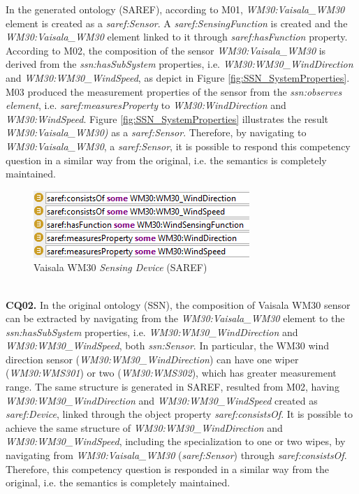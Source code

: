 \documentclass{sig-alternate-05-2015}
\begin{document}
In the generated ontology (SAREF), according to M01, \textit{WM30:Vaisala\_WM30} element is created as a \textit{saref:Sensor}. A \textit{saref:SensingFunction} is created and the \textit{WM30:Vaisala\_WM30} element linked to it through \textit{saref:hasFunction} property. According to M02, the composition of the sensor \textit{WM30:Vaisala\_WM30} is derived from the \textit{ssn:hasSubSystem} properties, i.e. \textit{WM30:WM30\_WindDirection} and \textit{WM30:WM30\_WindSpeed}, as depict in Figure \ref{fig:SSN_SystemProperties}. M03 produced the measurement properties of the sensor from the \textit{ssn:observes element}, i.e. \textit{saref:measuresProperty} to \textit{WM30:WindDirection} and \textit{WM30:WindSpeed}. Figure \ref{fig:SSN_SystemProperties} illustrates the result \textit{WM30:Vaisala\_WM30)} as a \textit{saref:Sensor}. Therefore, by navigating to \textit{WM30:Vaisala\_WM30}, a \textit{saref:Sensor}, it is possible to respond this competency question in a similar way from the original, i.e. the semantics is completely maintained.  
\begin{figure}[h!]
\centering
\includegraphics[scale=0.98]{SAREF_Sensor_WM30}
\caption{Vaisala WM30 \textit{Sensing Device} (SAREF)}
\label{fig:SAREF_Sensor_WM30}
\end{figure}
\\\textbf{CQ02.} In the original ontology (SSN), the composition of Vaisala WM30 sensor can be extracted by navigating from the \textit{WM30:Vaisala\_WM30} element to the \textit{ssn:hasSubSystem} properties, i.e. \textit{WM30:WM30\_WindDirection} and \textit{WM30:WM30\_WindSpeed}, both \textit{ssn:Sensor}. In particular, the WM30 wind direction sensor (\textit{WM30:WM30\_WindDirection}) can have one wiper (\textit{WM30:WMS301}) or two (\textit{WM30:WMS302}), which has greater measurement range. The same structure is generated in SAREF, resulted from M02, having \textit{WM30:WM30\_WindDirection} and \textit{WM30:WM30\_WindSpeed} created as \textit{saref:Device}, linked through the object property \textit{saref:consistsOf}. It is possible to achieve the same structure of \textit{WM30:WM30\_WindDirection} and \textit{WM30:WM30\_WindSpeed}, including the specialization to one or two wipes, by navigating from \textit{WM30:Vaisala\_WM30} (\textit{saref:Sensor}) through \textit{saref:consistsOf}. Therefore, this competency question is responded in a similar way from the original, i.e. the semantics is completely maintained.
\end{document}

